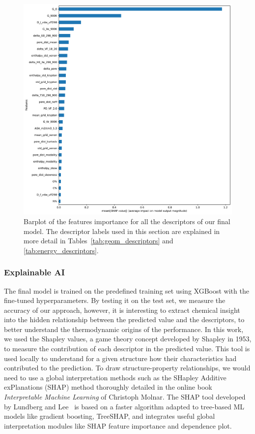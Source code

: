 \documentclass[main]{subfiles}
\begin{document}
\begin{figure}[ht]
  \centering
    \includegraphics[width=0.70\linewidth]{figures/4-ml/SI_figure/Feature_importance_shapbased.pdf}
    \caption{Barplot of the features importance for all the descriptors of our final model. The descriptor labels used in this section are explained in more detail in Tables~\ref{tab:geom_descriptors} and \ref{tab:energy_descriptors}.}\label{fgr:featimp_shap}
  \end{figure}

\subsubsection{Explainable AI}

The final model is trained on the predefined training set using XGBoost with the fine-tuned hyperparameters. By testing it on the test set, we measure the accuracy of our approach, however, it is interesting to extract chemical insight into the hidden relationship between the predicted value and the descriptors, to better understand the thermodynamic origins of the performance. In this work, we used the Shapley values,\autocite{shapley1953value} a game theory concept developed by Shapley in 1953, to measure the contribution of each descriptor in the predicted value. This tool is used locally to understand for a given structure how their characteristics had contributed to the prediction. To draw structure-property relationships, we would need to use a global interpretation methods such as the SHapley Additive exPlanations (SHAP) method thoroughly detailed in the online book \emph{Interpretable Machine Learning} of Christoph Molnar.\autocite{molnar2020interpretable} The SHAP tool developed by Lundberg and Lee~\autocite{SHAP} is based on a faster algorithm adapted to tree-based ML models like gradient boosting, TreeSHAP, and integrates useful global interpretation modules like SHAP feature importance and dependence plot.
\end{document}

